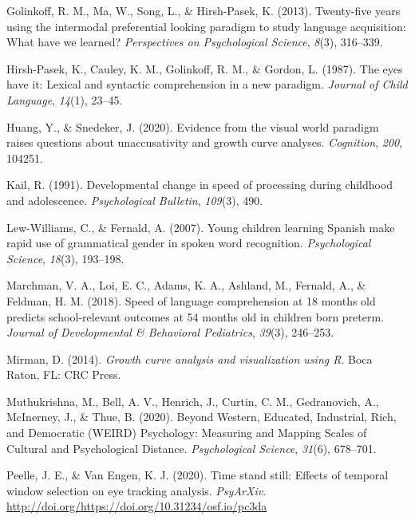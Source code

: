 \documentclass[10pt, letterpaper]{article}
\begin{document}
\leavevmode\hypertarget{ref-Golinkoff2013}{}%
Golinkoff, R. M., Ma, W., Song, L., \& Hirsh-Pasek, K. (2013).
Twenty-five years using the intermodal preferential looking paradigm to
study language acquisition: What have we learned? \emph{Perspectives on
Psychological Science}, \emph{8}(3), 316--339.

\leavevmode\hypertarget{ref-Hirsh-Pasek1987}{}%
Hirsh-Pasek, K., Cauley, K. M., Golinkoff, R. M., \& Gordon, L. (1987).
The eyes have it: Lexical and syntactic comprehension in a new paradigm.
\emph{Journal of Child Language}, \emph{14}(1), 23--45.

\leavevmode\hypertarget{ref-Huang2020}{}%
Huang, Y., \& Snedeker, J. (2020). Evidence from the visual world
paradigm raises questions about unaccusativity and growth curve
analyses. \emph{Cognition}, \emph{200}, 104251.

\leavevmode\hypertarget{ref-kail1991}{}%
Kail, R. (1991). Developmental change in speed of processing during
childhood and adolescence. \emph{Psychological Bulletin}, \emph{109}(3),
490.

\leavevmode\hypertarget{ref-Lew-Williams2007}{}%
Lew-Williams, C., \& Fernald, A. (2007). Young children learning Spanish
make rapid use of grammatical gender in spoken word recognition.
\emph{Psychological Science}, \emph{18}(3), 193--198.

\leavevmode\hypertarget{ref-Marchman2018}{}%
Marchman, V. A., Loi, E. C., Adams, K. A., Ashland, M., Fernald, A., \&
Feldman, H. M. (2018). Speed of language comprehension at 18 months old
predicts school-relevant outcomes at 54 months old in children born
preterm. \emph{Journal of Developmental \& Behavioral Pediatrics},
\emph{39}(3), 246--253.

\leavevmode\hypertarget{ref-Mirman2014}{}%
Mirman, D. (2014). \emph{Growth curve analysis and visualization using
R}. Boca Raton, FL: CRC Press.

\leavevmode\hypertarget{ref-Muthukrishna2020}{}%
Muthukrishna, M., Bell, A. V., Henrich, J., Curtin, C. M., Gedranovich,
A., McInerney, J., \& Thue, B. (2020). Beyond Western, Educated,
Industrial, Rich, and Democratic (WEIRD) Psychology: Measuring and
Mapping Scales of Cultural and Psychological Distance.
\emph{Psychological Science}, \emph{31}(6), 678--701.

\leavevmode\hypertarget{ref-Peelle2020}{}%
Peelle, J. E., \& Van Engen, K. J. (2020). Time stand still: Effects of
temporal window selection on eye tracking analysis. \emph{PsyArXiv}.
\url{http://doi.org/https://doi.org/10.31234/osf.io/pc3da}
\end{document}
